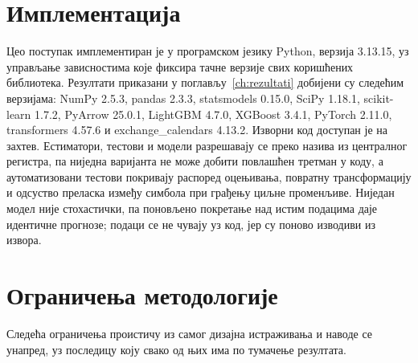 \section{Имплементација}

Цео поступак имплементиран је у програмском језику Python, верзија 3.13.15, уз
управљање зависностима које фиксира тачне верзије свих коришћених библиотека.
Резултати приказани у поглављу~\ref{ch:rezultati} добијени су следећим верзијама:
NumPy 2.5.3, pandas 2.3.3, statsmodels 0.15.0, SciPy 1.18.1, scikit-learn 1.7.2,
PyArrow 25.0.1, LightGBM 4.7.0, XGBoost 3.4.1, PyTorch 2.11.0, transformers 4.57.6
и exchange\_calendars 4.13.2. Изворни код доступан је на захтев. Естиматори, тестови и
модели разрешавају се преко назива из централног регистра, па ниједна варијанта не
може добити повлашћен третман у коду, а аутоматизовани тестови покривају распоред
оцењивања, повратну трансформацију и одсуство преласка између симбола при грађењу
циљне променљиве. Ниједан модел није стохастички, па поновљено покретање над истим
подацима даје идентичне прогнозе; подаци се не чувају уз код, јер су поново изводиви
из извора.

\section{Ограничења методологије}
\label{sec:ogranicenja}

Следећа ограничења проистичу из самог дизајна истраживања и наводе се унапред, уз
последицу коју свако од њих има по тумачење резултата.


